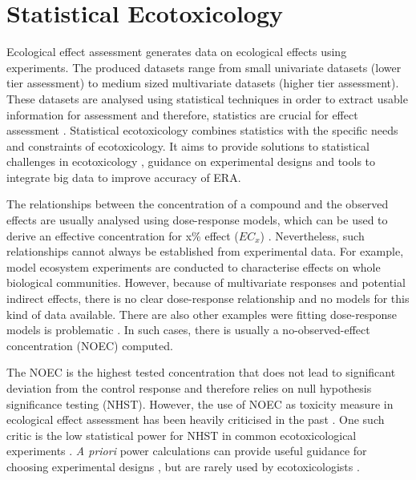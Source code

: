 
\section{Statistical Ecotoxicology}
Ecological effect assessment generates data on ecological effects using experiments. 
The produced datasets range from small univariate datasets (lower tier assessment) to medium sized multivariate datasets (higher tier assessment).
These datasets are analysed using statistical techniques in order to extract usable information for assessment and therefore, statistics are crucial for effect assessment \citep{newman_quantitative_2012}.
Statistical ecotoxicology combines statistics with the specific needs and constraints of ecotoxicology. 
It aims to provide solutions to statistical challenges in ecotoxicology \citep{fox_comment_2016}, guidance on experimental designs \citep{johnson_power_2015} and tools to integrate big data \citep {van_den_brink_new_2016} to improve accuracy of ERA. 

The relationships between the concentration of a compound and the observed effects are usually analysed using dose-response models, which can be used to derive an effective concentration for x\% effect ($EC_{x}$) \citep{ritz_toward_2010}. 
Nevertheless, such relationships cannot always be established from experimental data.
For example, model ecosystem experiments are conducted to characterise effects on whole biological communities.
However, because of multivariate responses and potential indirect effects, there is no clear dose-response relationship and no models for this kind of data available. 
There are also other examples were fitting dose-response models is problematic \citep{green_issues_2016}. 
In such cases, there is usually a no-observed-effect concentration (NOEC) computed. 

The NOEC is the highest tested concentration that does not lead to significant deviation from the control response and therefore relies on null hypothesis significance testing (NHST). 
However, the use of NOEC as toxicity measure in ecological effect assessment has been heavily criticised in the past \citep{laskowski_good_1995, chapman_warning:_1996, warne_noec_2008, fox_what_2012, jager_bad_2012, fox_dont_2016}. 
One such critic is the low statistical power for NHST in common ecotoxicological experiments \citep{van_der_hoeven_power_1998}.
\emph{A priori} power calculations can provide useful guidance for choosing experimental designs \citep{johnson_power_2015}, but are rarely used by ecotoxicologists \citep{newman_what_2008}. 

